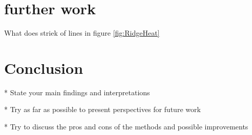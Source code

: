\documentclass[amssymb,twocolumn,aps]{revtex4}
\begin{document}

\section{further work}
What does striek of lines in figure \ref{fig:RidgeHeat}

\section{Conclusion}\label{section:conclusion} 
 * State your main findings and interpretations

 * Try as far as possible to present perspectives for future work

 * Try to discuss the pros and cons of the methods and possible improvements

\end{document}
